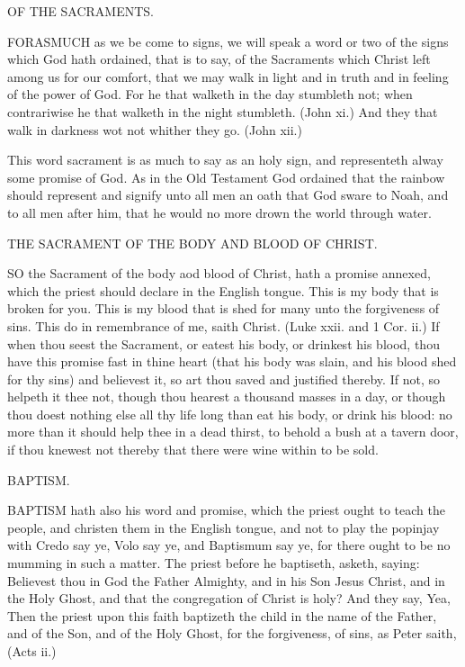 OF THE SACRAMENTS. 

FORASMUCH as we be come to signs, we will speak 
a word or two of the signs which God hath ordained, 
that is to say, of the Sacraments which Christ left among 
us for our comfort, that we may walk in light and in truth 
and in feeling of the power of God. For he that walketh 
in the day stumbleth not; when contrariwise he that 
walketh in the night stumbleth. (John xi.) And they that 
walk in darkness wot not whither they go. (John xii.) 

This word sacrament is as much to say as an holy sign, 
and representeth alway some promise of God. As in the 
Old Testament God ordained that the rainbow should represent
and signify unto all men an oath that God sware 
to Noah, and to all men after him, that he would no more 
drown the world through water. 


THE SACRAMENT OF THE BODY AND BLOOD 
OF CHRIST. 

SO the Sacrament of the body aod blood of Christ, hath 
a promise annexed, which the priest should declare in 
the English tongue. This is my body that is broken for 
you. This is my blood that is shed for many unto the 
forgiveness of sins. This do in remembrance of me, saith 
Christ. (Luke xxii. and 1 Cor. ii.) If when thou seest 
the Sacrament, or eatest his body, or drinkest his blood, 
thou have this promise fast in thine heart (that his body 
was slain, and his blood shed for thy sins) and believest it, 
so art thou saved and justified thereby. If not, so helpeth 
it thee not, though thou hearest a thousand masses in a 
day, or though thou doest nothing else all thy life long than 
eat his body, or drink his blood: no more than it should 
help thee in a dead thirst, to behold a bush at a tavern 
door, if thou knewest not thereby that there were wine 
within to be sold. 


BAPTISM. 

BAPTISM hath also his word and promise, which the 
priest ought to teach the people, and christen them in 
the English tongue, and not to play the popinjay with 
Credo say ye, Volo say ye, and Baptismum say ye, 
for there ought to be no mumming in such a matter. The 
priest before he baptiseth, asketh, saying: Believest thou 
in God the Father Almighty, and in his Son Jesus Christ, 
and in the Holy Ghost, and that the congregation of 
Christ is holy? And they say, Yea, Then the priest 
upon this faith baptizeth the child in the name of the 
Father, and of the Son, and of the Holy Ghost, for the 
forgiveness, of sins, as Peter saith, (Acts ii.) 

